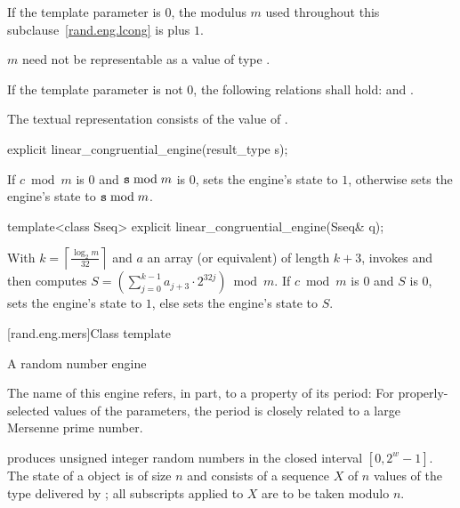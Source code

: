 \pnum
If the template parameter
 is $0$,
the modulus $m$
used throughout this subclause~\ref{rand.eng.lcong}
is  plus $1$.
\begin{note}
 $m$ need not be representable
 as a value of type .
\end{note}

\pnum
If the template parameter
 is not $0$,
the following relations shall hold:
and
  .

\pnum
The textual representation
consists of
the value of .

%
\begin{itemdecl}
explicit linear_congruential_engine(result_type s);
\end{itemdecl}

\begin{itemdescr}
\pnum
\effects
 If $c \bmod m$ is $0$ and $\texttt{\protect s} \bmod m$ is $0$,
 sets the engine's state to $1$,
 otherwise sets the engine's state to $\texttt{\protect s} \bmod m$.
\end{itemdescr}

%
\begin{itemdecl}
template<class Sseq> explicit linear_congruential_engine(Sseq& q);
\end{itemdecl}

\begin{itemdescr}
\pnum
\effects
 With
 $k = \left\lceil \frac{\log_2 m}{32} \right\rceil$
 and $a$ an array (or equivalent)
 of length $k + 3$,
 invokes 
 and then computes
 $S = \left(\sum_{j = 0}^{k - 1} a_{j + 3} \cdot 2^{32j} \right) \bmod m$.
 If $c \bmod m$ is $0$ and $S$ is $0$,
 sets the engine's state to $1$,
 else sets the engine's state
 to $S$.
\end{itemdescr}


[rand.eng.mers]{Class template }%
%

\pnum
A  random number
engine
\begin{footnote}
The name of this engine refers, in part, to a property of its period:
 For properly-selected values of the parameters,
 the period is closely related to a large Mersenne prime number.
\end{footnote}
produces unsigned integer random numbers
in the closed interval $[0,2^w-1]$.
The
state
of a  object 
is of size $n$
and consists of a sequence $X$
of $n$ values of the type delivered by ;
all subscripts applied to $X$ are to be taken modulo $n$.

